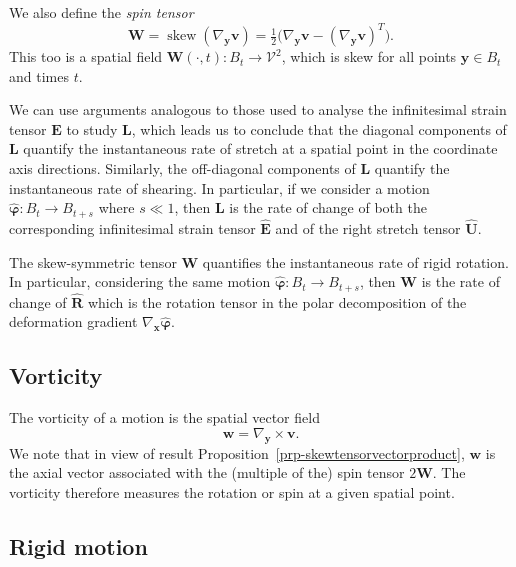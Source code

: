 \documentclass[
  letterpaper,
  DIV=11,
  numbers=noendperiod]{scrreprt}
\theoremstyle{plain}
\theoremstyle{remark}
\begin{document}
We also define the \emph{spin tensor}
\[{\boldsymbol{W}}= {\operatorname{skew}}(\nabla_{\boldsymbol{y}}{\boldsymbol{v}}) = \tfrac12\big(\nabla_{\boldsymbol{y}}{\boldsymbol{v}}-(\nabla_{\boldsymbol{y}}{\boldsymbol{v}})^T\big).\]
This too is a spatial field
\({\boldsymbol{W}}(\cdot,t):B_t\to{\mathcal{V}}^2\), which is skew for
all points \({\boldsymbol{y}}\in B_t\) and times \(t\).

We can use arguments analogous to those used to analyse the
infinitesimal strain tensor \({\boldsymbol{E}}\) to study
\({\boldsymbol{L}}\), which leads us to conclude that the diagonal
components of \({\boldsymbol{L}}\) quantify the instantaneous rate of
stretch at a spatial point in the coordinate axis directions. Similarly,
the off-diagonal components of \({\boldsymbol{L}}\) quantify the
instantaneous rate of shearing. In particular, if we consider a motion
\(\widehat{\boldsymbol{\varphi}}:B_t\to B_{t+s}\) where \(s\ll 1\), then
\({\boldsymbol{L}}\) is the rate of change of both the corresponding
infinitesimal strain tensor \(\widehat{\boldsymbol{E}}\) and of the
right stretch tensor \(\widehat{\boldsymbol{U}}\).

The skew-symmetric tensor \({\boldsymbol{W}}\) quantifies the
instantaneous rate of rigid rotation. In particular, considering the
same motion \(\widehat{\boldsymbol{\varphi}}:B_t\to B_{t+s}\), then
\({\boldsymbol{W}}\) is the rate of change of
\(\widehat{\boldsymbol{R}}\) which is the rotation tensor in the polar
decomposition of the deformation gradient
\(\nabla_{\boldsymbol{x}}\widehat{\boldsymbol{\varphi}}\).

\subsection{Vorticity}\label{vorticity}

The vorticity of a motion is the spatial vector field
\[{\boldsymbol{w}}= \nabla_{\boldsymbol{y}}\times{\boldsymbol{v}}.\] We
note that in view of result
Proposition~\ref{prp-skewtensorvectorproduct}, \({\boldsymbol{w}}\) is
the axial vector associated with the (multiple of the) spin tensor
\(2{\boldsymbol{W}}\). The vorticity therefore measures the rotation or
spin at a given spatial point.

\subsection{Rigid motion}\label{rigid-motion}
\end{document}
